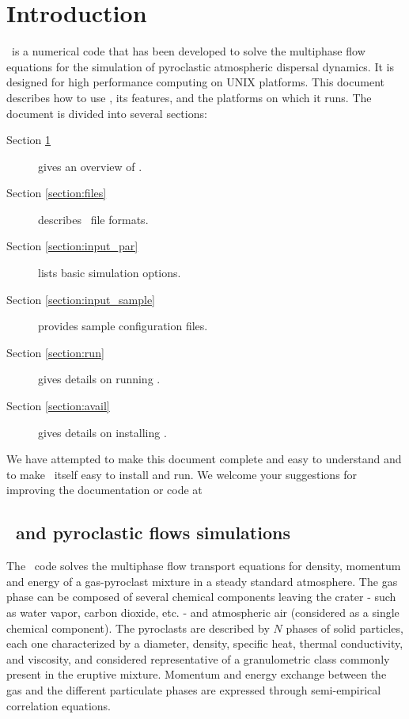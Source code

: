 \section{Introduction}
\label{section:intro}

\PDAC\ is a numerical code that has been developed to solve the multiphase
flow equations for the simulation of pyroclastic atmospheric dispersal dynamics.
It is designed for high performance computing on UNIX platforms.
This document describes how to use 
\PDAC, its features, and the platforms on which it runs.
The document is divided into several sections:
\begin{description}
\item[Section \ref{section:intro}] gives an overview of \PDAC.
\item[Section \ref{section:files}] describes \PDAC\ file formats.
\item[Section \ref{section:input_par}] lists basic simulation options.
\item[Section \ref{section:input_sample}] provides sample configuration files.
\item[Section \ref{section:run}] gives details on running \PDAC.
\item[Section \ref{section:avail}] gives details on installing \PDAC.
\end{description}

We have attempted to make this document complete and easy to understand and 
to make \PDAC\ itself easy to install and run.
We welcome your suggestions for improving the documentation or code
at \PDACADDRESS\

\subsection{\PDAC\ and pyroclastic flows simulations}

The \PDAC\ code solves the multiphase flow transport equations for
density, momentum and energy of a gas-pyroclast mixture in a steady
standard atmosphere.
The gas phase can be composed of several chemical components leaving
the crater - such as water vapor, carbon dioxide, etc. - and
atmospheric air (considered as a single chemical component).
The pyroclasts are described by $N$ phases of solid particles,
each one characterized by a diameter, density, specific
heat, thermal conductivity, and viscosity, and considered
representative of a granulometric class commonly present in
the eruptive mixture. Momentum and energy exchange between the gas
and the different particulate phases are expressed through semi-empirical
correlation equations.

